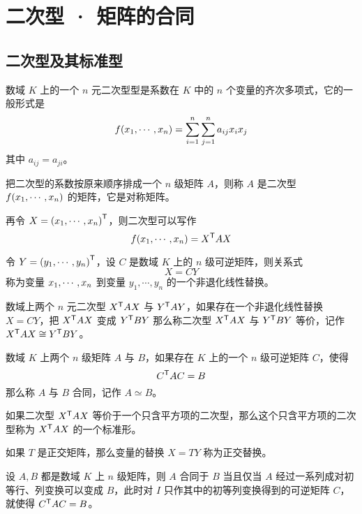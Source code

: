 
\chapter{二次型 · 矩阵的合同}

\section{二次型及其标准型}

\begin{definition}
    数域 $K$ 上的一个 $n$ 元二次型型是系数在 $K$ 中的 $n$ 个变量的齐次多项式，它的一般形式是
    \[f(x_1,\cdots,x_n) = \sum_{i=1}^n\sum_{j=1}^na_{ij}x_ix_j\]
    其中 $a_{ij} = a_{ji}$。
\end{definition}

把二次型的系数按原来顺序排成一个 $n$ 级矩阵 $A$，则称 $A$ 是二次型 $f(x_1,\cdots,x_n)$ 的矩阵，它是对称矩阵。

再令 $X = {(x_1,\cdots,x_n)}^\mathsf{T}$，则二次型可以写作
\[f(x_1,\cdots,x_n) = {X}^\mathsf{T}AX\]

令 $Y = {(y_1,\cdots,y_n)}^\mathsf{T}$，设 $C$ 是数域 $K$ 上的 $n$ 级可逆矩阵，则关系式
\[X = CY\]
称为变量 $x_1,\cdots,x_n$ 到变量 $y_1,\cdots,y_n$ 的一个非退化线性替换。

\begin{definition}
    数域上两个 $n$ 元二次型 ${X}^\mathsf{T}AX$ 与 ${Y}^\mathsf{T}AY$，如果存在一个非退化线性替换 $X = CY$，把 ${X}^\mathsf{T}AX$ 变成 ${Y}^\mathsf{T}BY$ 那么称二次型 ${X}^\mathsf{T}AX$ 与 ${Y}^\mathsf{T}BY$ 等价，记作 ${X}^\mathsf{T}AX \cong {Y}^\mathsf{T}BY$。
\end{definition}

\begin{definition}
    数域 $K$ 上两个 $n$ 级矩阵 $A$ 与 $B$，如果存在 $K$ 上的一个 $n$ 级可逆矩阵 $C$，使得
    \[{C}^\mathsf{T}AC = B\]
    那么称 $A$ 与 $B$ 合同，记作 $A\simeq B$。
\end{definition}

如果二次型 ${X}^\mathsf{T} A X$ 等价于一个只含平方项的二次型，那么这个只含平方项的二次型称为 ${X}^\mathsf{T}AX$ 的一个标准形。

如果 $T$ 是正交矩阵，那么变量的替换 $X = TY$ 称为正交替换。

\begin{theorem}
    设 $A,B$ 都是数域 $K$ 上 $n$ 级矩阵，则 $A$ 合同于 $B$ 当且仅当 $A$ 经过一系列成对初等行、列变换可以变成 $B$，此时对 $I$ 只作其中的初等列变换得到的可逆矩阵 $C$，就使得 ${C}^\mathsf{T}AC=B$。
\end{theorem}

